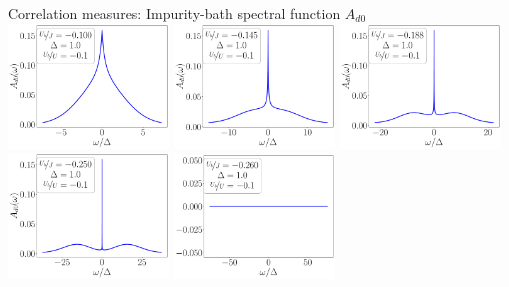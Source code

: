 \documentclass[aspectratio=169]{beamer}
\begin{document}
\begin{frame}[noframenumbering]{Correlation measures: Impurity-bath spectral function \(A_{d0}\)}
\centering
\includegraphics[width=0.32\textwidth]{./figures/spec_func_d0_Ub_by_J=-0.100.pdf}
\includegraphics[width=0.32\textwidth]{./figures/spec_func_d0_Ub_by_J=-0.145.pdf}
\includegraphics[width=0.32\textwidth]{./figures/spec_func_d0_Ub_by_J=-0.188.pdf}
\includegraphics[width=0.32\textwidth]{./figures/spec_func_d0_Ub_by_J=-0.250.pdf}
\includegraphics[width=0.32\textwidth]{./figures/spec_func_d0_Ub_by_J=-0.26.pdf}
\end{frame}
\end{document}
